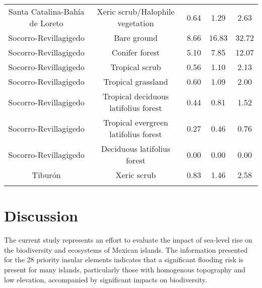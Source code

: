 \documentclass{article} %
\begin{document}
\begin{table}
\begin{adjustwidth}{-0.5cm}{}
\begin{tabular}{ccccc}
Santa Catalina-Bahía de Loreto &    Xeric scrub/Halophile vegetation & 0.64 & 1.29 &  2.63 \\
Socorro-Revillagigedo &         Bare ground & 8.66 & 16.83 & 32.72 \\
Socorro-Revillagigedo &        Conifer forest & 5.10 & 7.85 & 12.07 \\
Socorro-Revillagigedo &        Tropical scrub & 0.56 & 1.10 &  2.13 \\
Socorro-Revillagigedo &       Tropical grassland & 0.60 & 1.09 &  2.00 \\
Socorro-Revillagigedo &  Tropical deciduous latifolius forest & 0.44 & 0.81 &  1.52 \\
Socorro-Revillagigedo &  Tropical evergreen latifolius forest & 0.27 & 0.46 &  0.76 \\
Socorro-Revillagigedo &     Deciduous latifolius forest & 0.00 & 0.00 &  0.00 \\
Tiburón &         Xeric scrub & 0.83 & 1.46 &  2.58 \\
\hline
\label{Tab:tab5} 
\end{tabular}
\end{adjustwidth}
\end{table}


\section{Discussion}

The current study represents an effort to evaluate the impact of sea-level rise on the
biodiversity and ecosystems of Mexican islands. The information presented for the 28
priority insular elements indicates that a significant flooding risk is present for many
islands, particularly those with homogenous topography and low elevation,
accompanied by significant impacts on biodiversity.\\
\end{document}
